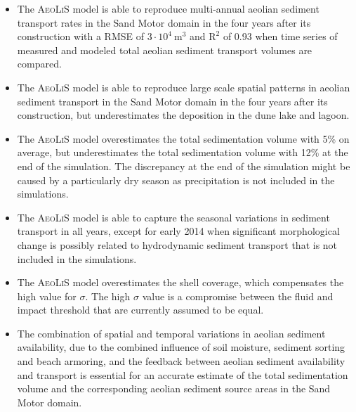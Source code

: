 \begin{itemize}
\item The \textsc{AeoLiS} model is able to reproduce multi-annual
  aeolian sediment transport rates in the Sand Motor domain in the
  four years after its construction with a RMSE of
  $3 \cdot 10^4 ~ \mathrm{m^3}$ and $\mathrm{R^2}$ of 0.93 when time
  series of measured and modeled total aeolian sediment transport
  volumes are compared.
\item The \textsc{AeoLiS} model is able to reproduce large scale
  spatial patterns in aeolian sediment transport in the Sand Motor
  domain in the four years after its construction, but underestimates
  the deposition in the dune lake and lagoon.
\item The \textsc{AeoLiS} model overestimates the total sedimentation
  volume with 5\% on average, but underestimates the total
  sedimentation volume with 12\% at the end of the simulation. The
  discrepancy at the end of the simulation might be caused by a
  particularly dry season as precipitation is not included in the
  simulations.
\item The \textsc{AeoLiS} model is able to capture the seasonal
  variations in sediment transport in all years, except for early 2014
  when significant morphological change is possibly related to
  hydrodynamic sediment transport that is not included in the
  simulations.
\item The \textsc{AeoLiS} model overestimates the shell coverage,
  which compensates the high value for $\sigma$. The high $\sigma$
  value is a compromise between the fluid and impact threshold that
  are currently assumed to be equal.
\item The combination of spatial and temporal variations in aeolian
  sediment availability, due to the combined influence of soil
  moisture, sediment sorting and beach armoring, and the feedback
  between aeolian sediment availability and transport is essential for
  an accurate estimate of the total sedimentation volume and the
  corresponding aeolian sediment source areas in the Sand Motor
  domain.
\end{itemize}

